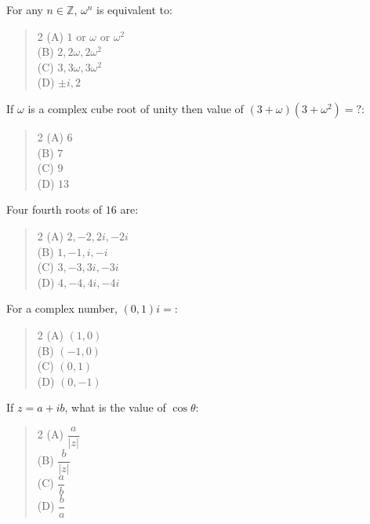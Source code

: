 \documentclass[11pt,a4paper]{article}
\begin{document}
\begin{mcqlist}
\item For any $n\in\mathbb Z$, $\omega^n$ is equivalent to:
\begin{quote}\begin{multicols}{2}
\noindent (A) $1$ or $\omega$ or $\omega^2$ \\
(B) $2,2\omega,2\omega^2$ \\
(C) $3,3\omega,3\omega^2$ \\
(D) $\pm i,2$
\end{multicols}\end{quote}

\item If $\omega$ is a complex cube root of unity then value of $(3+\omega)(3+\omega^2)=?$:
\begin{quote}\begin{multicols}{2}
\noindent (A) $6$ \\
(B) $7$ \\
(C) $9$ \\
(D) $13$
\end{multicols}\end{quote}

\item Four fourth roots of $16$ are:
\begin{quote}\begin{multicols}{2}
\noindent (A) $2,-2,2i,-2i$ \\
(B) $1,-1,i,-i$ \\
(C) $3,-3,3i,-3i$ \\
(D) $4,-4,4i,-4i$
\end{multicols}\end{quote}

\item For a complex number, $(0,1)i=$:
\begin{quote}\begin{multicols}{2}
\noindent (A) $(1,0)$ \\
(B) $(-1,0)$ \\
(C) $(0,1)$ \\
(D) $(0,-1)$
\end{multicols}\end{quote}

\item If $z=a+ib$, what is the value of $\cos\theta$:
\begin{quote}\begin{multicols}{2}
\noindent (A) $\dfrac{a}{|z|}$ \\
(B) $\dfrac{b}{|z|}$ \\
(C) $\dfrac{a}{b}$ \\
(D) $\dfrac{b}{a}$
\end{multicols}\end{quote}


\end{mcqlist}
\end{document}
